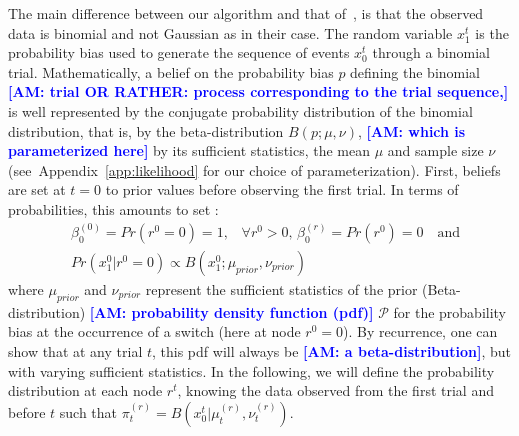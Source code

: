 \documentclass[12pt,english]{article}%
\newcommand{\eql}[1]{\begin{equation}#1\end{equation}}
\newcommand{\eqa}[1]{\begin{align}#1\end{align}}
\newcommand{\Pp}{\mathcal{P}}
\newcommand{\citep}[1]{\parencite{#1}}
\newcommand{\seeApp}[1]{Appendix~\ref{app:#1}}
\newcommand{\AM}[1]{\textbf{\textcolor{blue}{[AM: #1]}}}
\begin{document}
The main difference between our algorithm and that of~\citep{AdamsMackay2007},
is that the observed data is binomial and not Gaussian as in their case.
The random variable $x_1^t$ is the probability bias used
to generate the sequence of events $x_0^t$ through a binomial trial.
Mathematically, a belief on the probability bias $p$ defining the binomial \AM{trial OR RATHER: process corresponding to the trial sequence,}
is well represented by the conjugate probability distribution of the binomial distribution,
that is, by the beta-distribution $B(p; \mu, \nu)$,
\AM{which is parameterized here} by its sufficient statistics,
the mean $\mu$ and sample size $\nu$
(see~\seeApp{likelihood} for our choice of parameterization).
First, beliefs are set at $t=0$ to prior values before observing the first trial.
In terms of probabilities, this amounts to set :
\eqa{
& \beta^{(0)}_0=Pr(r^0=0)=1 \text{,}\quad \forall r^0>0 \text{, } \beta^{(r)}_0=Pr(r^0)=0 \quad \text{and} \\
& Pr(x_1^0 | r^0=0) \propto B(x_1^0; \mu_{prior}, \nu_{prior})
}
where $\mu_{prior}$ and $\nu_{prior}$ represent the sufficient statistics
of the prior (Beta-distribution) \AM{probability density function (pdf)} $\Pp$
for the probability bias
at the occurrence of a switch (here at node $r^0=0$).
By recurrence, one can show that at any trial $t$,
this pdf will always be \AM{a beta-distribution},
but with varying sufficient statistics.
In the following, we will define the probability distribution at each node $r^t$,
knowing the data observed from the first trial and before $t$ such that
$
\pi^{(r)}_t = B( x_0^t |  \mu^{(r)}_{t}, \nu^{(r)}_{t})
$. %
\end{document}
